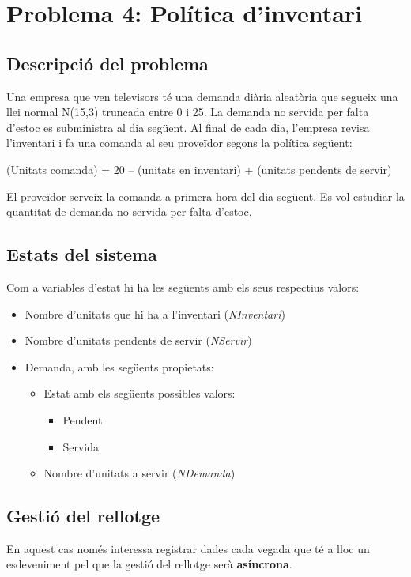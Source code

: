 \documentclass[a4paper]{article}
\begin{document}
\pagebreak
\section{Problema 4: Política d'inventari}
\subsection{Descripció del problema}
Una empresa que ven televisors té una demanda diària aleatòria que segueix una llei normal N(15,3) truncada entre 0 i 25. La demanda no servida per falta d’estoc es subministra al dia següent. Al final de cada dia, l’empresa revisa l’inventari i fa una comanda al seu proveïdor segons la política següent:

(Unitats comanda) = 20 – (unitats en inventari) + (unitats pendents de servir)

El proveïdor serveix la comanda a primera hora del dia següent.
Es vol estudiar la quantitat de demanda no servida per falta d’estoc.

\subsection{Estats del sistema}
Com a variables d'estat hi ha les següents amb els seus respectius valors:
\begin{itemize}
	\item Nombre d'unitats que hi ha a l'inventari (\emph{NInventari})
	\item Nombre d'unitats pendents de servir (\emph{NServir})
	\item Demanda, amb les següents propietats:
	\begin{itemize}
		\item Estat amb els següents possibles valors:
		\begin{itemize}
			\item Pendent
			\item Servida
		\end{itemize}
		\item Nombre d'unitats a servir (\emph{NDemanda})
	\end{itemize}
\end{itemize}

\subsection{Gestió del rellotge}
En aquest cas només interessa registrar dades cada vegada que té a lloc un esdeveniment pel que la gestió del rellotge serà \textbf{asíncrona}.
\end{document}
